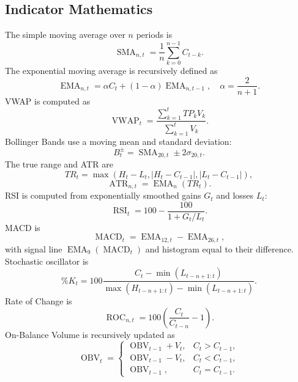 \documentclass[conference]{IEEEtran}
\begin{document}
\subsection{Indicator Mathematics}

The simple moving average over $n$ periods is
\begin{equation}
\operatorname{SMA}_{n,t}=\frac{1}{n}\sum_{k=0}^{n-1} C_{t-k}.
\end{equation}
The exponential moving average is recursively defined as
\begin{equation}
\operatorname{EMA}_{n,t}=\alpha C_t+(1-\alpha)\operatorname{EMA}_{n,t-1},
\quad \alpha=\frac{2}{n+1}.
\end{equation}
VWAP is computed as
\begin{equation}
\operatorname{VWAP}_t =
\frac{\sum_{k=1}^{t} TP_k V_k}{\sum_{k=1}^{t} V_k}.
\end{equation}
Bollinger Bands use a moving mean and standard deviation:
\begin{equation}
B_t^{\pm} = \operatorname{SMA}_{20,t} \pm 2\sigma_{20,t}.
\end{equation}
The true range and ATR are
\begin{equation}
TR_t=\max(H_t-L_t, |H_t-C_{t-1}|, |L_t-C_{t-1}|),
\end{equation}
\begin{equation}
\operatorname{ATR}_{n,t}=\operatorname{EMA}_n(TR_t).
\end{equation}
RSI is computed from exponentially smoothed gains $G_t$ and losses $L_t$:
\begin{equation}
\operatorname{RSI}_t = 100-\frac{100}{1+G_t/L_t}.
\end{equation}
MACD is
\begin{equation}
\operatorname{MACD}_t=\operatorname{EMA}_{12,t}-\operatorname{EMA}_{26,t},
\end{equation}
with signal line $\operatorname{EMA}_9(\operatorname{MACD}_t)$ and histogram
equal to their difference. Stochastic oscillator is
\begin{equation}
\%K_t = 100\frac{C_t-\min(L_{t-n+1:t})}
{\max(H_{t-n+1:t})-\min(L_{t-n+1:t})}.
\end{equation}
Rate of Change is
\begin{equation}
\operatorname{ROC}_{n,t}=100\left(\frac{C_t}{C_{t-n}}-1\right).
\end{equation}
On-Balance Volume is recursively updated as
\begin{equation}
\operatorname{OBV}_t =
\begin{cases}
\operatorname{OBV}_{t-1}+V_t, & C_t>C_{t-1},\\
\operatorname{OBV}_{t-1}-V_t, & C_t<C_{t-1},\\
\operatorname{OBV}_{t-1}, & C_t=C_{t-1}.
\end{cases}
\end{equation}
\end{document}
